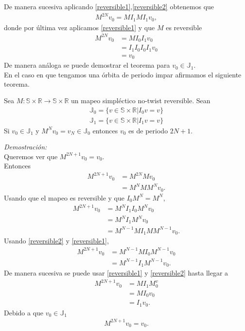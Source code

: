 De manera sucesiva aplicando \ref{reversible1},\ref{reversible2} obtenemos que 
\begin{align*}
		M^{2N}v_{0}=MI_{1}MI_{1}v_{0},
\end{align*} 
donde por \'ultima vez aplicamos \ref{reversible1} y que $M$ es reversible
\begin{align*}
M^{2N}v_{0}&=MI_{0}I_{1}v_{0}\\
			&= I_{1}I_{0}I_{0}I_{1}v_{0}\\
			&=v_{0}
\end{align*}
De manera an\'aloga se puede demostrar el teorema para $v_{0}\in \mathbb{J}_{1}$.\\

En el caso en que tengamos una \'orbita de periodo impar afirmamos el siguiente teorema. 

\begin{thm}
	Sea $M:\mathbb{S} \times \mathbb{R} \longrightarrow \mathbb{S}\times\mathbb{R}$ un mapeo simpl\'ectico no-twist reversible. Sean 
	\begin{eqnarray}
	\mathbb{J}_{0} = \{v \in \mathbb{S} \times \mathbb{R} | I_{0}v = v\}
	\end{eqnarray}
	\begin{eqnarray}
	\mathbb{J}_{1} = \{v \in \mathbb{S} \times \mathbb{R} | I_{1}v = v\}
	\end{eqnarray}
	Si $v_{0}\in \mathbb{J}_{1}$ y $M^{N}v_{0}=v_{N}\in \mathbb{J}_{0}$ entonces $v_{0}$ es de periodo $2N+1$.
\end{thm}

\textit{Demostraci\'on:}\\
Queremos ver que $M^{2N+1}v_{0}=v_{0}$.\\
Entonces
\begin{align*}
M^{2N+1}v_{0} &= M^{2N}Mv_{0}\\
			&= M^{N}MM^{N}v_{0}.
\end{align*}
Usando que el mapeo es reversible y que $I_{0}M^{N}=M^{N}$,
\begin{align*}
M^{2N+1}v_{0} &= M^{N}I_{1}I_{0}M^{N}v_{0}\\
				&= M^{N}I_{1}M^{N}v_{0}\\
				&= M^{N-1}MI_{1}MM^{N-1}v_{0}.
\end{align*}
Usando \ref{reversible2} y \ref{reversible1},
\begin{align*}
M^{2N+1}v_{0} &= M^{N-1}MI_{0}M^{N-1}v_{0}\\
				&= M^{N-1}I_{1}M^{N-1}v_{0}.
\end{align*}
De manera sucesiva se puede usar \ref{reversible1} y \ref{reversible2} hasta llegar a 
\begin{align*}
M^{2N+1}v_{0} &= MI_{1}M^v_{0}\\
			&= MI_{0}v_{0}\\
			&= I_{1}v_{0}.
\end{align*}
Debido a que $v_{0}\in \mathbb{J}_{1}$ 
\begin{align*}
M^{2N+1}v_{0} = v_{0}.
\end{align*}

